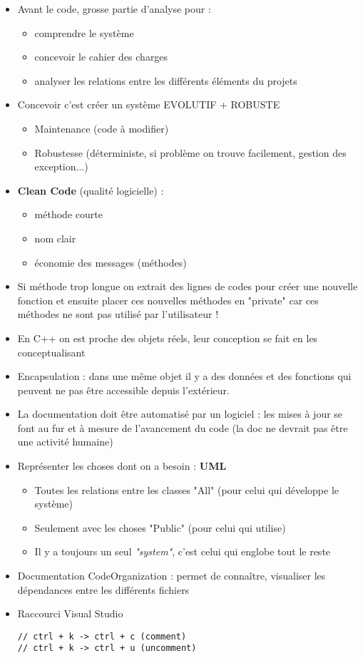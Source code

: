 \documentclass[12pt,a4paper]{article}
\begin{document}
\begin{itemize}
\item Avant le code, grosse partie d'analyse pour : 
\begin{itemize}
\item comprendre le système
\item concevoir le cahier des charges
\item analyser les relations entre les différents éléments du projets
\end{itemize}
\item Concevoir c'est créer un système EVOLUTIF + ROBUSTE
\begin{itemize}
\item Maintenance (code à modifier)
\item Robustesse (déterministe, si problème on trouve facilement, gestion des exception...)
\end{itemize}
\item \textbf{Clean Code} (qualité logicielle) :
\begin{itemize}
\item méthode courte
\item nom clair
\item économie des messages (méthodes)
\end{itemize}
\item Si méthode trop longue on extrait des lignes de codes pour créer une nouvelle fonction et ensuite placer ces nouvelles méthodes en "private" car ces méthodes ne sont pas utilisé par l'utilisateur !
\item En C++ on est proche des objets réels, leur conception se fait en les conceptualisant
\item Encapsulation : dans une même objet il y a des données et des fonctions qui peuvent ne pas être accessible depuis l'extérieur.
\item La documentation doit être automatisé par un logiciel : les mises à jour se font au fur et à mesure de l'avancement du code (la doc ne devrait pas être une activité humaine)
\item Représenter les choses dont on a besoin : \textbf{UML}
\begin{itemize}
\item Toutes les relations entre les classes "All" (pour celui qui développe le système)
\item Seulement avec les choses "Public" (pour celui qui utilise)
\item Il y a toujours un seul \textit{"system"}, c'est celui qui englobe tout le reste
\end{itemize}
\item Documentation CodeOrganization : permet de connaître, visualiser les dépendances entre les différents fichiers
\item Raccourci Visual Studio
\begin{lstlisting}
// ctrl + k -> ctrl + c (comment)
// ctrl + k -> ctrl + u (uncomment)
\end{lstlisting}
\end{itemize}
\end{document}
